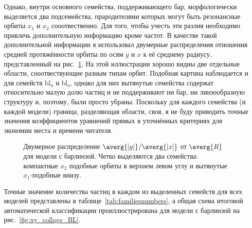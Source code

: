 \documentclass[tikz]{trlnotes}
\begin{document}
Однако, внутри основного семейства, поддерживающего бар, морфологически выделяется два подсемейства,
прародителями которых могут быть резонансные орбиты $x_1$ и $x_2$ сооотвественно. Для того, чтобы учесть
эти разлия необходимо привлечь дополнительную информацию кроме частот.
В качестве такой дополнительной информации я использовал двумерные распределения отношения средней протяжённости
орбиты по осям $y$ и $x$ к её среднему радиусу, представленный на рис.~\ref{fig:x1x2sep}. На этой иллюстрации
хорошо видны две отдельные области, сооотвествующие разным типам орбит. Подобная картина наблюдается и для семейств
$\text{bl}_\text{u}$ и $\text{bl}_\text{o}$, однако для них вытянутые семейства содержат
относительно малую долю частиц и не поддерживают ни бар, ни линзообразную структуру и, поэтому, были просто убраны. 
Поскольку для каждого семейства (и каждой
модели) граница, разделяющая области, своя, я не буду приводить точные значения коэффициентов уравнений прямых в
уточнённых критериях для экономии места и времени читателя.  

\begin{figure}[htpb]
  \centering
\caption{Двумерное распределение $\averg{|y|}/\averg{|x|}$ от $\averg{R}$ для модели с барлинзой. Четко выделяются
два семейства: компактные $x_2$ подобные орбиты в верхнем левом углу и вытянутые $x_1$-подобные внизу. }%
\label{fig:x1x2sep}
\end{figure}

Точные значение количества частиц в каждом из выделенных семейств для всех моделей представлены в таблице~\ref{tab:familiesnumbers},
а общая схема итоговой автоматической классификации проиллюстрирована для модели с барлинзой на рис.~\ref{fig:xy_collage_BL}.
\end{document}
